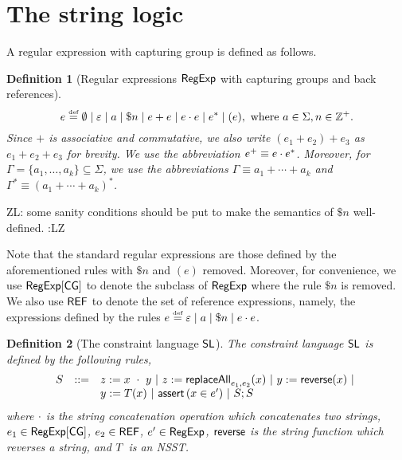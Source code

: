 \documentclass[sigplan,review,anonymous]{acmart}\settopmatter{printfolios=true,printccs=false,printacmref=false}
\newcommand{\zhilin}[1]{\color{brown} {ZL: #1 :LZ} \color{black}}
\newcommand{\zhilin}[1]{}
\newtheorem{definition}{Definition}
\newcommand\NSST{{\sf NSST}}
\newcommand\refexp{{\sf REF}}
\begin{document}
\section{The string logic}


A regular expression with capturing group is defined as follows.

\begin{definition}[Regular expressions ${\sf RegExp}$ with capturing groups and back references]
	\[e \eqdef \emptyset \mid \varepsilon \mid a \mid \$n \mid e + e \mid e \concat e \mid e^* \mid (e), \mbox{ where } a \in \Sigma, n \in \Int^+. \]
	Since $+$ is associative and commutative, we also write $(e_1 + e_2) + e_3$ as $e_1 + e_2 + e_3$ for brevity. We use the abbreviation $e^+ \equiv e \cdot e^*$. Moreover, for $\Gamma = \{a_1, \ldots, a_k\}\subseteq \Sigma$, we use the abbreviations $\Gamma \equiv a_1 + \cdots + a_k$ and $\Gamma^\ast \equiv (a_1 + \cdots + a_k)^\ast$. 
\end{definition}
\zhilin{some sanity conditions should be put to make the semantics of $\$ n$ well-defined.}

Note that the standard regular expressions are those defined by the aforementioned rules with $\$ n$ and $(e)$ removed.
Moreover, for convenience, we use ${\sf RegExp}[\sf CG]$ to denote the subclass of ${\sf RegExp}$ where the rule $\$ n$ is removed. We also use $\refexp$ to denote the set of reference expressions, namely, the expressions defined by the rules $e \eqdef \varepsilon \mid a \mid \$n \mid e \concat e$.





\begin{definition}[The constraint language $\mathsf{SL}$]%
The constraint language $\mathsf{SL}$ is defined by the following rules,
\[
\begin{array}{l c l}
S &::= &  z:= x\ \cdot\ y \ |\ z := \mathsf{replaceAll}_{e_1, e_2}(x) \ | \  y := \mathsf{reverse}(x) \ |\ \\
& &  y := T(x)\ |\  \text{$\textsf{assert}\left(x \in e'\right)$}\ |\ S; S\
\label{eq:SL}
\end{array}
\]
where $\cdot$ is the string concatenation operation which concatenates two strings, $e_1 \in {\sf RegExp}[\sf CG]$, $e_2 \in \refexp$, $e' \in {\sf RegExp}$, %
$\mathsf{reverse}$ is the string function which reverses a string, and $T$ is an \NSST{}.  
\end{definition}
\end{document}
